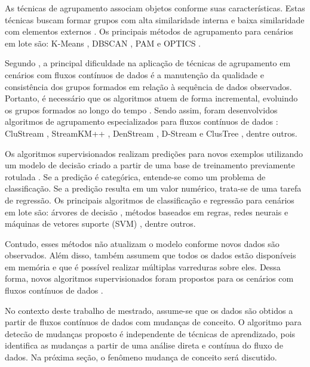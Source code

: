 \documentclass[qual, classic, a4paper]{ufbathesis}
\begin{document}
As técnicas de agrupamento associam objetos conforme suas características.
Estas técnicas buscam formar grupos com alta similaridade interna e baixa similaridade com elementos externos \cite{Jain:1988:ACD:46712}.
Os principais métodos de agrupamento para cenários em lote são:
K-Means \cite{Lloyd:2006:LSQ:2263356.2269955},
DBSCAN \cite{Ester:1996:DAD:3001460.3001507},
PAM \cite{kaufman:clustering1990} e 
OPTICS \cite{Ankerst:1999:OOP:304181.304187}.

Segundo \cite{Gama:2010:KDD:1855075}, a principal dificuldade na aplicação de técnicas de agrupamento em cenários com fluxos contínuos de dados  
é a manutenção da qualidade e consistência dos grupos formados em relação à sequência de dados observados. 
Portanto, é necessário que os algoritmos atuem de forma incremental, evoluindo os grupos formados ao longo do tempo \cite{Barbara:2002:RCD:507515.507519}.
Sendo assim, foram desenvolvidos algoritmos de agrupamento especializados para fluxos contínuos de dados \cite{Aggarwal:2003:FCE:1315451.1315460}:
CluStream \cite{Aggarwal:2003:FCE:1315451.1315460},
StreamKM++ \cite{Ackermann:2012:SCA:2133803.2184450},
DenStream \cite{Cao:Feng:Ester},
D-Stream \cite{Chen:Tu} e ClusTree \cite{Kranen:2011:CIM:2134350.2134352}, dentre outros.

Os algoritmos supervisionados realizam predições para novos exemplos utilizando um modelo de decisão criado a partir de uma base de treinamento previamente rotulada \cite{Kotsiantis:2007:SML:1566770.1566773}.
Se a predição é categórica, entende-se como um problema de classificação.
Se a predição resulta em um valor numérico, trata-se de uma tarefa de regressão.
Os principais algoritmos de classificação e regressão para cenários em lote são:
árvores de decisão \cite{Breiman:Classification_Regression_Trees},
métodos baseados em regras, 
redes neurais e máquinas de vetores suporte (SVM) \cite{Vapnik1998}, 
dentre outros.

Contudo, esses métodos não atualizam o modelo conforme novos dados são observados.
Além disso, também assumem que todos os dados estão disponíveis em memória e que é possível realizar múltiplas varreduras sobre eles.
Dessa forma, novos algoritmos supervisionados foram propostos para os cenários com fluxos contínuos de dados \cite{Domingos:2000:MHD:347090.347107, Bifet:2013:EDS:2480362.2480516, Wang:2003:MCD:956750.956778, Aggarwal:2004:DCD:1014052.1014110, Gama:2003:ADT:956750.956813}.

No contexto deste trabalho de mestrado, assume-se que os dados são obtidos a partir de fluxos contínuos de dados com mudanças de conceito.
O algoritmo para detecão de mudanças proposto é independente de técnicas de aprendizado, 
pois identifica as mudanças a partir de uma análise direta e contínua do fluxo de dados.
Na próxima seção, o fenômeno mudança de conceito será discutido.
\end{document}
